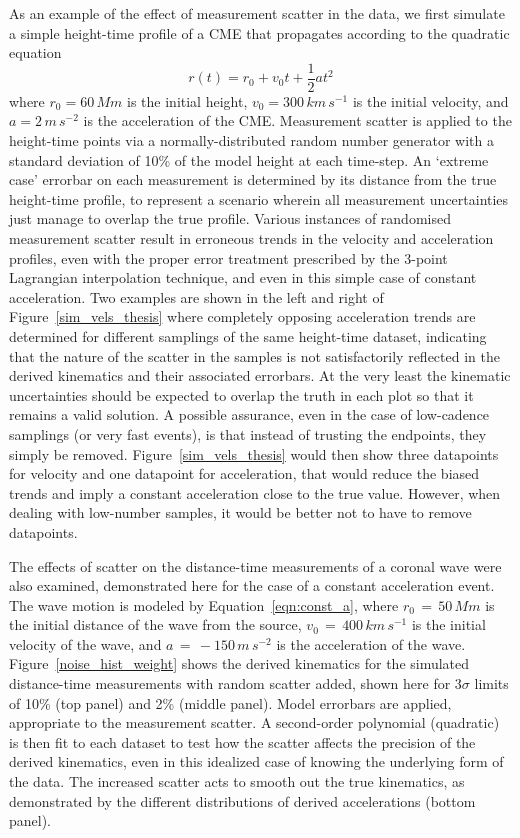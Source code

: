 \documentclass[structabstract]{aa}
\begin{document}
As an example of the effect of measurement scatter in the data, we first simulate a simple height-time profile of a CME that propagates according to the quadratic equation
\begin{equation}
\label{eqn:const_a}
r(t) = r_0 + v_0 t + \frac{1}{2}a t^2
\end{equation}
where $r_0=60\,Mm$ is the initial height, $v_0=300\,km\,s^{-1}$ is the initial velocity, and $a=2\,m\,s^{-2}$ is the acceleration of the CME. Measurement scatter is applied to the height-time points via a normally-distributed random number generator with a standard deviation of 10\% of the model height at each time-step. An `extreme case' errorbar on each measurement is determined by its distance from the true height-time profile, to represent a scenario wherein all measurement uncertainties just manage to overlap the true profile. Various instances of randomised measurement scatter result in erroneous trends in the velocity and acceleration profiles, even with the proper error treatment prescribed by the 3-point Lagrangian interpolation technique, and even in this simple case of constant acceleration. Two examples are shown in the left and right of Figure~\ref{sim_vels_thesis} where completely opposing acceleration trends are determined for different samplings of the same height-time dataset, indicating that the nature of the scatter in the samples is not satisfactorily reflected in the derived kinematics and their associated errorbars. At the very least the kinematic uncertainties should be expected to overlap the truth in each plot so that it remains a valid solution. A possible assurance, even in the case of low-cadence samplings (or very fast events), is that instead of trusting the endpoints, they simply be removed. Figure~\ref{sim_vels_thesis} would then show three datapoints for velocity and one datapoint for acceleration, that would reduce the biased trends and imply a constant acceleration close to the true value. However, when dealing with low-number samples, it would be better not to have to remove datapoints.


The effects of scatter on the distance-time measurements of a coronal wave were also examined, demonstrated here for the case of a constant acceleration event. The wave motion is modeled by Equation~\ref{eqn:const_a}, where $r_0\,=\,50\,Mm$ is the initial distance of the wave from the source, $v_0\,=\,400\,km\,s^{-1}$ is the initial velocity of the wave, and $a\,=\,-150\,m\,s^{-2}$ is the acceleration of the wave. Figure~\ref{noise_hist_weight} shows the derived kinematics for the simulated distance-time measurements with random scatter added, shown here for 3$\sigma$ limits of 10\% (top panel) and 2\% (middle panel). Model errorbars are applied, appropriate to the measurement scatter. A second-order polynomial (quadratic) is then fit to each dataset to test how the scatter affects the precision of the derived kinematics, even in this idealized case of knowing the underlying form of the data. The increased scatter acts to smooth out the true kinematics, as demonstrated by the different distributions of derived accelerations (bottom panel).
\end{document}
